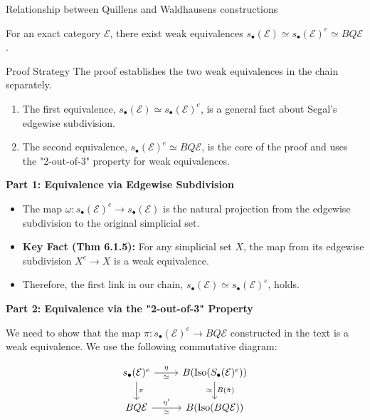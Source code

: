 \documentclass[10pt]{beamer}
\begin{document}
\begin{frame}{Relationship between Quillens and Waldhausens constructions}
		\begin{theorem}
		For an exact category \( \mathcal{E} \), there exist weak equivalences \( s_\bullet(\mathcal{E}) \simeq s_\bullet(\mathcal{E})^e \simeq BQ \mathcal{E}\).
	\end{theorem}
	
	\framebreak
	\begin{alertblock}{Proof Strategy}
		The proof establishes the two weak equivalences in the chain separately.
		\begin{enumerate}
			\item The first equivalence, $s_\bullet(\mathcal{E}) \simeq s_\bullet(\mathcal{E})^e$, is a general fact about Segal's edgewise subdivision.
			\item The second equivalence, $s_\bullet(\mathcal{E})^e \simeq BQ\mathcal{E}$, is the core of the proof and uses the "2-out-of-3" property for weak equivalences.
		\end{enumerate}
	\end{alertblock}
	
	\framebreak
	
	\textbf{Part 1: Equivalence via Edgewise Subdivision}
	
	\begin{itemize}
		\item The map $\omega: s_\bullet(\mathcal{E})^e \to s_\bullet(\mathcal{E})$ is the natural projection from the edgewise subdivision to the original simplicial set.
		\item \textbf{Key Fact (Thm 6.1.5):} For any simplicial set $X$, the map from its edgewise subdivision $X^e \to X$ is a weak equivalence.
		\item Therefore, the first link in our chain, $s_\bullet(\mathcal{E}) \simeq s_\bullet(\mathcal{E})^e$, holds.
	\end{itemize}
	
	
	
	\textbf{Part 2: Equivalence via the "2-out-of-3" Property}
	
	We need to show that the map $\pi: s_\bullet(\mathcal{E})^e \to BQ\mathcal{E}$ constructed in the text is a weak equivalence. We use the following commutative diagram:
	
	\[
	\begin{tikzcd}
		s_\bullet(\mathcal{E})^e \arrow{r}{\eta}[swap]{\simeq} \arrow{d}{\pi} & B(\text{Iso}(S_\bullet(\mathcal{E})^e)) \arrow{d}{B(\tilde{\pi})}[swap]{\simeq} \\
		B Q \mathcal{E} \arrow{r}{\eta'}[swap]{\simeq} & B(\text{Iso}(B Q \mathcal{E}))
	\end{tikzcd}
	\]
	

\end{frame}
\end{document}
